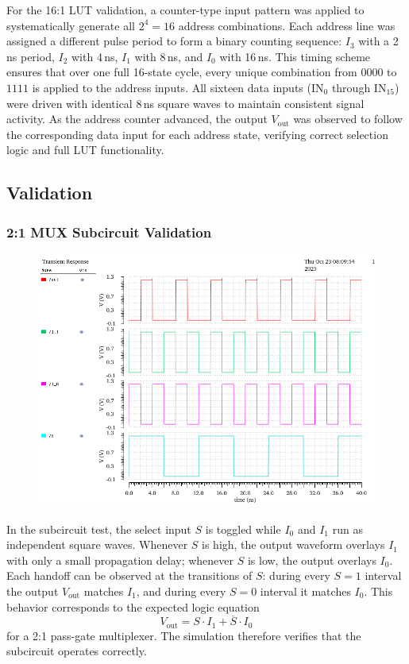 \documentclass[12pt]{article}
\begin{document}
For the 16:1 LUT validation, a counter-type input pattern was applied to systematically generate all \( 2^4 = 16 \) address combinations. 
Each address line was assigned a different pulse period to form a binary counting sequence: \( I_3 \) with a 2\,ns period, \( I_2 \) with 4\,ns, \( I_1 \) with 8\,ns, and \( I_0 \) with 16\,ns. This timing scheme ensures that over one full 16-state cycle, every unique combination from \( 0000 \) to \( 1111 \) is applied to the address inputs. All sixteen data inputs (\( \text{IN}_0 \) through \( \text{IN}_{15} \)) were driven with identical 8\,ns square waves to maintain consistent signal activity. 
As the address counter advanced, the output \( V_{\text{out}} \) was observed to follow the corresponding data input for each address state, verifying correct selection logic and full LUT functionality.

\newpage

\subsection{Validation}
\subsubsection*{2:1 MUX Subcircuit Validation}
\begin{figure}[H]
    \centering
    \includegraphics[width=\linewidth]{writeup//figures/muxsubval.png}
    \caption{}
\end{figure}

In the subcircuit test, the select input \( S \) is toggled while \( I_0 \) and \( I_1 \) run as independent square waves. 
Whenever \( S \) is high, the output waveform overlays \( I_1 \) with only a small propagation delay; whenever \( S \) is low, the output overlays \( I_0 \). 
Each handoff can be observed at the transitions of \( S \): during every \( S=1 \) interval the output \( V_{\text{out}} \) matches \( I_1 \), and during every \( S=0 \) interval it matches \( I_0 \). 
This behavior corresponds to the expected logic equation 
\[
V_{\text{out}} = S \cdot I_1 + \overline{S} \cdot I_0
\]
for a 2:1 pass-gate multiplexer. 
The simulation therefore verifies that the subcircuit operates correctly.
\end{document}
